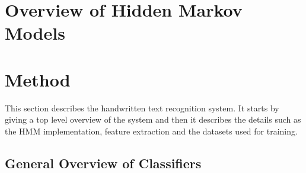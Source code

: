 \documentclass[10pt, titlepage, oneside, a4paper]{article}
\begin{document}
	\tableofcontents
	
	\newpage


	\setlength{\parindent}{0pt}
	\setlength{\parskip}{10pt}















\section{Overview of Hidden Markov Models}



\section{Method}\label{sec:method}

This section describes the handwritten text recognition system. It starts by giving a top level overview of the system and then it describes the details such as the HMM implementation, feature extraction and the datasets used for training. 


\subsection{General Overview of Classifiers}\label{sec:overview_of_classifiers}



\end{document}
